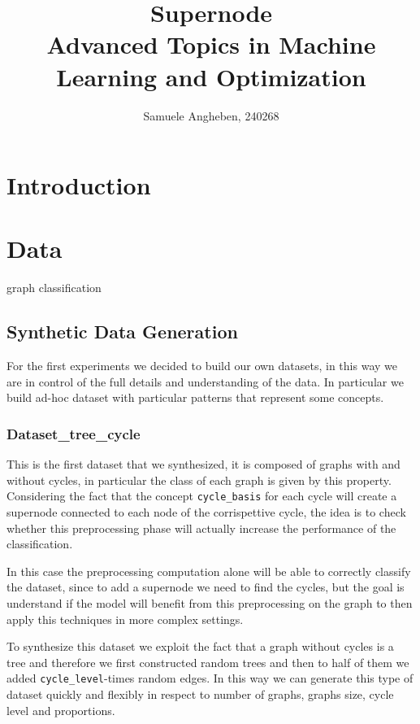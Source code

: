 \documentclass{article}
\title{Supernode\\Advanced Topics in Machine Learning and Optimization}
\author{Samuele Angheben, 240268}
\date{}
\begin{document}
	\maketitle

    \section{Introduction}


	\section{Data}
    graph classification
    \subsection{Synthetic Data Generation}
    For the first experiments we decided to build our own datasets, in this way we are in control of the full details and understanding of the data. In particular we build ad-hoc dataset with particular patterns that represent some concepts.

    \subsubsection{Dataset\_tree\_cycle}
    This is the first dataset that we synthesized, it is composed of graphs with and without cycles, in particular the class of each graph is given by this property. \\
    Considering the fact that the concept \texttt{cycle\_basis} for each cycle will create a supernode connected to each node of the corrispettive cycle, the idea is to check whether this preprocessing phase will actually increase the performance of the classification.
    \begin{remark}
        In this case the preprocessing computation alone will be able to correctly classify the dataset, since to add a supernode we need to find the cycles, but the goal is understand if the model will benefit from this preprocessing on the graph to then apply this techniques in more complex settings.
    \end{remark}

    \noindent
    To synthesize this dataset we exploit the fact that a graph without cycles is a tree and therefore we first constructed random trees and then to half of them we added \texttt{cycle\_level}-times random edges. In this way we can generate this type of dataset quickly and flexibly in respect to number of graphs, graphs size, cycle level and proportions.
\end{document}
